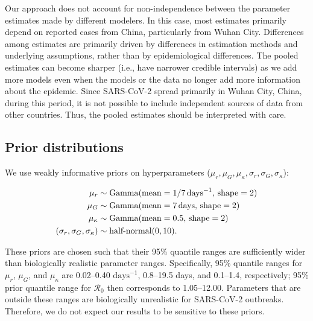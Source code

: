 \documentclass[12pt]{article}
\newcommand{\Ro}{\ensuremath{{\mathcal R}_{0}}\xspace}
\begin{document}
Our approach does not account for non-independence between the parameter estimates made by different modelers.
In this case, most estimates primarily depend on reported cases from China, particularly from Wuhan City.
Differences among estimates are primarily driven by differences in estimation methods and underlying assumptions, rather than by epidemiological differences.
The pooled estimates can become sharper (i.e., have narrower credible intervals) as we add more models even when the models or the data no longer add more information about the epidemic.
Since SARS-CoV-2 spread primarily in Wuhan City, China, during this period, it is not possible to include independent sources of data from other countries.
Thus, the pooled estimates should be interpreted with care.

\subsection{Prior distributions}

We use weakly informative priors on hyperparameters ($\mu_r, \mu_G, \mu_\kappa, \sigma_r, \sigma_G, \sigma_\kappa$):
\begin{linenomath*}
\begin{equation}
\begin{aligned}
\mu_r &\sim \mathrm{Gamma}(\mathrm{mean}=1/7\,\mathrm{days}^{-1},\,\mathrm{shape}=2)\\
\mu_G &\sim \mathrm{Gamma}(\mathrm{mean}=7\,\mathrm{days},\,\mathrm{shape}=2)\\
\mu_\kappa &\sim \mathrm{Gamma}(\mathrm{mean}=0.5,\,\mathrm{shape}=2)\\
(\sigma_r, \sigma_G, \sigma_\kappa) &\sim \textrm{half-normal}(0, 10).
\end{aligned}
\end{equation}
\end{linenomath*}
These priors are chosen such that their 95\% quantile ranges are sufficiently wider than biologically realistic parameter ranges.
Specifically, 95\% quantile ranges for $\mu_r$, $\mu_G$, and $\mu_\kappa$ are 0.02--0.40 $\mathrm{days}^{-1}$, 0.8--19.5 days, and 0.1--1.4, respectively;
95\% prior quantile range for \Ro then corresponds to 1.05--12.00.
Parameters that are outside these ranges are biologically unrealistic for SARS-CoV-2 outbreaks.
Therefore, we do not expect our results to be sensitive to these priors.
\end{document}
